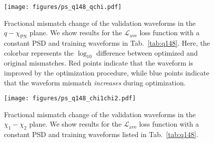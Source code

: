 \documentclass[twocolumn]{aastex631}
\begin{document}
\begin{figure}[t]
	\centering
	\texttt{[image: figures/ps\_q148\_qchi.pdf]}
	\caption{Fractional mismatch change of the validation waveforms in the $q-\chi_{\mathrm{PN}}$ plane. 
	We show results for the $\mathcal{L}_{\mathrm{ave}}$ loss function with a constant PSD 
	and training waveforms in Tab.~\ref{tab:q148}. Here, the colorbar represents the 
	$\log_{10}$ difference between optimized and original mismatches. Red points indicate that the waveform
	is improved by the optimization procedure, while blue points indicate that the waveform mismatch
	\textit{increases} during optimization.}
	\label{fig:ps_q148_qchi}
\end{figure}
\begin{figure}[t]
	\centering
	\texttt{[image: figures/ps\_q148\_chi1chi2.pdf]}
	\caption{Fractional mismatch change of the validation waveforms in the $\chi_1-\chi_2$ plane. We
	show results for the $\mathcal{L}_{\mathrm{ave}}$ loss function with a
	constant PSD and training waveforms listed in Tab.~\ref{tab:q148}.}
	\label{fig:ps_q148}
\end{figure}
\end{document}

